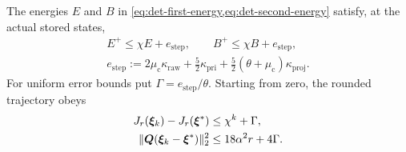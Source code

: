 \begin{lemma}
\label{lem:bounded-two-energies}
The energies $E$ and $B$ in \cref{eq:det-first-energy,eq:det-second-energy}
satisfy, at the actual stored states,
\begin{equation}
 \begin{gathered}
 E^+\leq\chi E+e_{\mathrm{step}},\qquad
 B^+\leq\chi B+e_{\mathrm{step}},\\
 e_{\mathrm{step}}:=2\mu_{\mathrm{c}}\kappa_{\mathrm{raw}}
       +\tfrac52\kappa_{\mathrm{pri}}
       +\tfrac52(\theta+\mu_{\mathrm{c}})\kappa_{\mathrm{proj}}.
 \end{gathered}
 \label{eq:bounded-energy-errors}
\end{equation}
For uniform error bounds put $\Gamma=e_{\mathrm{step}}/\theta$. Starting
from zero, the rounded trajectory obeys
\begin{equation*}
 \begin{aligned}
 J_r(\bm{\xi}_k)-J_r(\bm{\xi}^*)&\leq\chi^k+\Gamma,\\
 \lVert\bm{Q}(\bm{\xi}_k-\bm{\xi}^*)\rVert_2^2&\leq18\alpha^2r+4\Gamma.
 \end{aligned}
\end{equation*}
\end{lemma}
